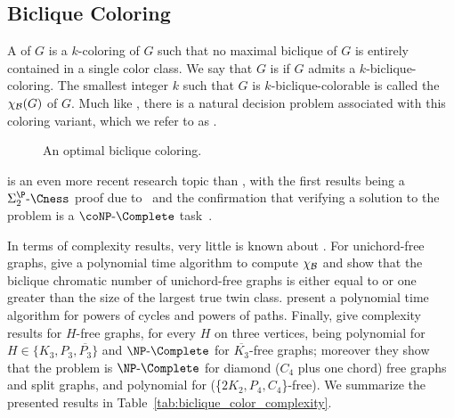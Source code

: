 \subsection{Biclique Coloring}
A  of $G$ is a $k$-coloring of $G$ such that no maximal biclique of $G$ is entirely contained in a single color class.
We say that $G$ is  if $G$ admits a $k$-biclique-coloring.
The smallest integer $k$ such that $G$ is $k$-biclique-colorable is called the  $\chi_{\mathcal{B}}(G)$ of $G$.
Much like , there is a natural decision problem associated with this coloring variant, which we refer to as .



\begin{figure}[!htb]
    \centering
    \caption{An optimal biclique coloring.}
    \label{fig:biclique_color}
\end{figure}


 is an even more recent research topic than , with the first results being a $\SiP{2}\text{-}\Cness$ proof due to~\cite{biclique_coloring_complexity} and the confirmation that verifying a solution to the problem is a $\coNP\text{-}\Complete$ task~\citep{biclique_coloring_verification}.

In terms of complexity results, very little is known about .
For unichord-free graphs, \cite{unichord_coloring} give a polynomial time algorithm to compute $\chi_{\mathcal{B}}$ and show that the biclique chromatic number of unichord-free graphs is either equal to or one greater than the size of the largest true twin class.
\cite{biclique_coloring_verification} present a polynomial time algorithm for powers of cycles and powers of paths.
Finally, \cite{biclique_coloring_complexity} give complexity results for $H$-free graphs, for every $H$ on three vertices, being polynomial for $H \in \{K_3, P_3, \overline{P_3}\}$ and $\NPc$ for $\overline{K_3}$-free graphs;
moreover they show that the problem is $\NPc$ for diamond ($C_4$ plus one chord) free graphs and split graphs, and polynomial for  (\{$2K_2,P_4,C_4$\}-free).
We summarize the presented results in Table~\ref{tab:biclique_color_complexity}.

